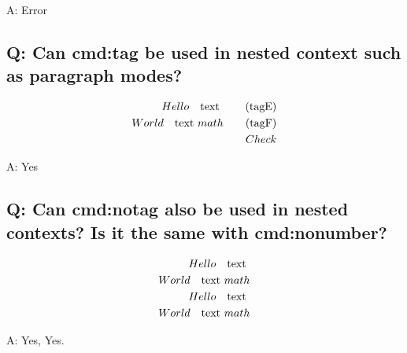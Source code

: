 \documentclass[11pt]{revtex4-1}
\begin{document}

A: Error

\subsection*{Q: Can cmd:tag be used in nested context such as paragraph modes?}
\begin{align}
  Hello \quad\text{text \tag{tagE}} \\
  World \quad\text{text $math\tag{tagF}$} \\
  Check
\end{align}

A: Yes

\subsection*{Q: Can cmd:notag also be used in nested contexts? Is it the same with cmd:nonumber?}
\begin{align}
  Hello \quad\text{text \notag} \\
  World \quad\text{text $math\notag$} \\
  Hello \quad\text{text \notag} \\
  World \quad\text{text $math\notag$}
\end{align}

A: Yes, Yes.
\end{document}
